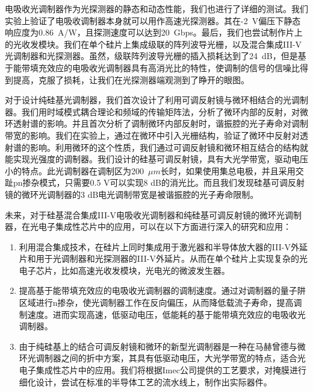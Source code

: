 电吸收光调制器作为光探测器的静态和动态性能，我们也进行了详细的测试。我们实验上验证了电吸收调制器本身就可以用作高速光探测器。其在-2~V偏压下静态响应度为0.86~A/W，且探测速度可以达到20~Gbps。最后，我们也尝试制作片上的光收发模块。我们在单个硅片上集成级联的阵列波导光栅，以及混合集成III-V光调制器和光探测器。虽然，级联阵列波导光栅的插入损耗达到了24~dB，但是基于能带填充效应的电吸收光调制器具有高消光比的特性，使调制的信号的信噪比得到提高，克服了损耗，让我们在光探测器端观测到了睁开的眼图。

对于设计纯硅基光调制器，我们首次设计了利用可调反射镜与微环相结合的光调制器。我们用时域模式耦合理论和频域的传输矩阵法，分析了微环内部的反射，对微环透射谱的影响。并且首次分析了调制微环内部反射时，谐振腔的光子寿命对调制带宽的影响。我们在实验上，通过在微环中引入光栅结构，验证了微环中反射对透射谱的影响。利用微环的这个性质，我们通过可调反射镜和微环相互结合的结构就能实现光强度的调制器。我们设计的硅基可调反射镜，具有大光学带宽，驱动电压小的特点。此光调制器在调制区为200~$\mu m$长时，如果使用集总电极，并且采用交趾pn掺杂模式，只需要0.5 V可以实现8 dB的消光比。而且我们发现硅基可调反射镜的微环光调制器的3 dB电光调制带宽是被谐振腔的光子寿命限制。

未来，对于硅基混合集成III-V电吸收光调制器和纯硅基可调反射镜的微环光调制器，在光电子集成性芯片中的应用，可以在以下方面进行深入的研究和应用：
\begin{enumerate}[(1)]
	\item 利用混合集成技术，在硅片上同时集成用于激光器和半导体放大器的III-V外延片和用于光调制器和光探测器的III-V外延片。从而在单个硅片上实现复杂的光电子芯片，比如高速光收发模块，光电光的微波发生器。
	\item 提高基于能带填充效应的电吸收光调制器的调制速度。通过对调制器的量子阱区域进行n掺杂，使光调制器工作在反向偏压，从而降低载流子寿命，提高调制速度。进而实现高速，低驱动电压，低能耗的基于能带填充效应的电吸收光调制器。
	\item 由于纯硅基上的结合可调反射镜和微环的新型光调制器是一种在马赫曾德与微环光调制器之间的折中方案，其具有低驱动电压，大光学带宽的特点，适合光电子集成性芯片中的应用。我们将根据Imec公司提供的工艺要求，对掩膜进行细化设计，尝试在标准的半导体工艺的流水线上，制作出实际器件。
\end{enumerate}

